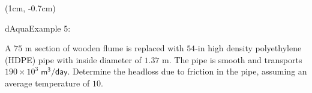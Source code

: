 \documentclass[9pt,xcolor=x11names,professionalfonts, mathserif]{beamer}
\begin{document}
											      																										\begin{frame}
											      																											
											      																											\begin{textblock*}{1\columnwidth}(1cm, -0.7cm)
											      																												\begin{cmini}[0.8]{
											      																														\begin{cb}[10]{dAqua}{Example 5:}{
											      																																A $75\text{ m}$ section of wooden flume is replaced with $54\text{-in}$ high density polyethylene (HDPE) pipe with inside diameter of
											      																																$1.37\text{ m}$.  The pipe is smooth and transports $190\times10^{3}\;\mathsf{ m^3/day}$. Determine the headloss due to friction in the
											      																																pipe, assuming an average temperature of $10$\textcelsius.\par\smallskip }
											      																														\end{cb}
											      																														}\end{cmini}
											      																													\end{textblock*}
											      																													
\end{frame}
\end{document}
